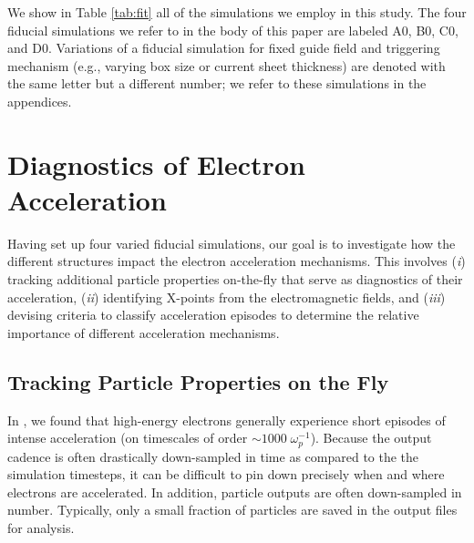 We show in Table \ref{tab:fit} all of the simulations we employ in this study.  The four fiducial simulations we refer to in the body of this paper are labeled A0, B0, C0, and D0.  Variations of a fiducial simulation for fixed guide field and triggering mechanism (e.g., varying box size or current sheet thickness) are denoted with the same letter but a different number; we refer to these simulations in the appendices.
 
 



	

\section{Diagnostics of Electron Acceleration}\label{diagnostics_of_acceleration}
Having set up four varied fiducial simulations, our goal is to investigate how the different structures impact the electron acceleration mechanisms.  This involves (\textit{i}) tracking additional particle properties on-the-fly that serve as diagnostics of their acceleration, (\textit{ii}) identifying X-points from the electromagnetic fields, and (\textit{iii}) devising criteria to classify acceleration episodes to determine the relative importance of different acceleration mechanisms.
\subsection{Tracking Particle Properties on the Fly} \label{diagnostics}
In \citet{ball2018}, we found that high-energy electrons generally experience short episodes of intense acceleration (on timescales of order $\sim 1000 \; \omega_{p}^{-1}$).  Because the output cadence is often drastically down-sampled in time as compared to the the simulation timesteps, it can be difficult to pin down precisely when and where electrons are accelerated.  In addition, particle outputs are often down-sampled in number.  Typically, only a small fraction of particles are saved in the output files for analysis. 


